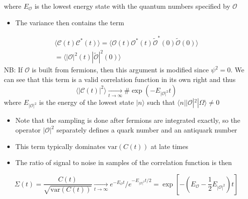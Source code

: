 where $E_\mathcal{O}$ is the lowest energy state with the quantum numbers specified by $\mathcal{O}$
\begin{itemize}
    \item The variance then contains the term
\end{itemize}
\begin{align}
    \langle \mathcal{C}(t) \mathcal{C}^*(t)\rangle = \langle \mathcal{O}(t)  \mathcal{O}^*(t) \tilde{\mathcal{O}}^*(0) \tilde{\mathcal{O}}(0) \rangle \nonumber \\
    = \langle | \mathcal{O} |^2(t) |\tilde{\mathcal{O}}|^2(0)\rangle
\end{align}
NB: If $\mathcal{O}$ is built from fermions, then this argument is modified since $\psi^2 = 0$.
We can see that this term is a valid correlation function in its own right and thus
\begin{equation}
    \langle | \mathcal{C}(t)|^2\rangle \underset{t\to\infty}{\rightarrow}\# \exp \left(-E_{|\mathcal{O}|^2} t\right)
\end{equation}
where $E_{|\mathcal{O}|^2}$ is the energy of the lowest state $|n\rangle$ such that $\langle n | |\mathcal{O} |^2 |\Omega \rangle \neq 0$
\begin{itemize}
    \item Note that the sampling is done after fermions are integrated exactly, so the operator $|\mathcal{O}|^2$ separately defines a quark number and an antiquark number
    \item This term typically dominates $\text{var}(C(t))$ at late times
    \item The ratio of signal to noise in samples of the correlation function is then
\end{itemize}
\begin{equation}
    \Sigma(t) = \frac{C(t)}{\sqrt{\text{var}(C(t))}} \underset{t \to \infty}{\rightarrow}e^{- E_\mathcal{O}t} / e^{- E_{| \mathcal{O} |^2} t/2} = \exp \left [ -(E_\mathcal{O} - \frac{1}{2}E_{|\mathcal{O}|^2}) t\right]
\end{equation}


